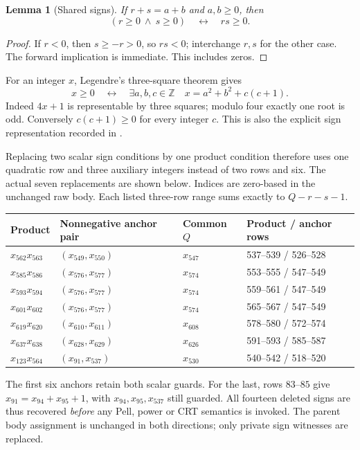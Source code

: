 \documentclass[11pt]{article}
\newcommand{\Z}{\mathbb Z}\newcommand{\N}{\mathbb N}
\newtheorem{lemma}[theorem]{Lemma}\newtheorem{proposition}[theorem]{Proposition}
\theoremstyle{definition}\newtheorem{definition}[theorem]{Definition}
\theoremstyle{remark}\newtheorem{remark}[theorem]{Remark}
\begin{document}
\begin{lemma}[Shared signs]\label{lem:sign}
If $r+s=a+b$ and $a,b\ge0$, then
\[
 (r\ge0\ \wedge\ s\ge0)\quad\longleftrightarrow\quad rs\ge0.
\]
\end{lemma}
\begin{proof}
If $r<0$, then $s\ge-r>0$, so $rs<0$; interchange $r,s$ for the
other case. The forward implication is immediate. This includes zeros.
\end{proof}
For an integer $x$, Legendre's three-square theorem gives
\begin{equation}\label{eq:signrep}
 x\ge0\quad\longleftrightarrow\quad
 \exists a,b,c\in\Z\quad x=a^2+b^2+c(c+1).
\end{equation}
Indeed $4x+1$ is representable by three squares; modulo four exactly one
root is odd. Conversely $c(c+1)\ge0$ for every integer $c$. This is also
the explicit sign representation recorded in \cite{sun}.

Replacing two scalar sign conditions by one product condition therefore
uses one quadratic row and three auxiliary integers instead of two rows
and six. The actual seven replacements are shown below. Indices are
zero-based in the unchanged raw body. Each listed three-row range sums
exactly to $Q-r-s-1$.

\begin{center}\small
\begin{tabular}{llll}
\toprule
Product & Nonnegative anchor pair & Common $Q$ & Product / anchor rows\\
\midrule
$x_{562}x_{563}$ &$(x_{549},x_{550})$&$x_{547}$&537--539 / 526--528\\
$x_{585}x_{586}$ &$(x_{576},x_{577})$&$x_{574}$&553--555 / 547--549\\
$x_{593}x_{594}$ &$(x_{576},x_{577})$&$x_{574}$&559--561 / 547--549\\
$x_{601}x_{602}$ &$(x_{576},x_{577})$&$x_{574}$&565--567 / 547--549\\
$x_{619}x_{620}$ &$(x_{610},x_{611})$&$x_{608}$&578--580 / 572--574\\
$x_{637}x_{638}$ &$(x_{628},x_{629})$&$x_{626}$&591--593 / 585--587\\
$x_{123}x_{564}$ &$(x_{91},x_{537})$&$x_{530}$&540--542 / 518--520\\
\bottomrule
\end{tabular}\end{center}
The first six anchors retain both scalar guards. For the last,
rows $83$--$85$ give $x_{91}=x_{94}+x_{95}+1$, with $x_{94},x_{95},x_{537}$
still guarded. All fourteen deleted signs are thus recovered \emph{before}
any Pell, power or CRT semantics is invoked. The parent body assignment
is unchanged in both directions; only private sign witnesses are replaced.
\end{document}
